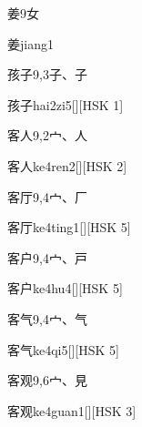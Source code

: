 \begin{entry}{姜}{9}{⼥}
  \begin{phonetics}{姜}{jiang1}
  \end{phonetics}
\end{entry}

\begin{entry}{孩子}{9,3}{⼦、⼦}
  \begin{phonetics}{孩子}{hai2zi5}[][HSK 1]
  \end{phonetics}
\end{entry}

\begin{entry}{客人}{9,2}{⼧、⼈}
  \begin{phonetics}{客人}{ke4ren2}[][HSK 2]
  \end{phonetics}
\end{entry}

\begin{entry}{客厅}{9,4}{⼧、⼚}
  \begin{phonetics}{客厅}{ke4ting1}[][HSK 5]
  \end{phonetics}
\end{entry}

\begin{entry}{客户}{9,4}{⼧、⼾}
  \begin{phonetics}{客户}{ke4hu4}[][HSK 5]
  \end{phonetics}
\end{entry}

\begin{entry}{客气}{9,4}{⼧、⽓}
  \begin{phonetics}{客气}{ke4qi5}[][HSK 5]
  \end{phonetics}
\end{entry}

\begin{entry}{客观}{9,6}{⼧、⾒}
  \begin{phonetics}{客观}{ke4guan1}[][HSK 3]
  \end{phonetics}
\end{entry}

